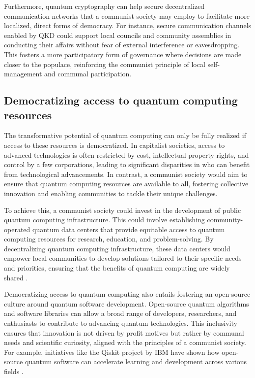 Furthermore, quantum cryptography can help secure decentralized communication networks that a communist society may employ to facilitate more localized, direct forms of democracy. For instance, secure communication channels enabled by QKD could support local councils and community assemblies in conducting their affairs without fear of external interference or eavesdropping. This fosters a more participatory form of governance where decisions are made closer to the populace, reinforcing the communist principle of local self-management and communal participation.

\subsection{Democratizing access to quantum computing resources}

The transformative potential of quantum computing can only be fully realized if access to these resources is democratized. In capitalist societies, access to advanced technologies is often restricted by cost, intellectual property rights, and control by a few corporations, leading to significant disparities in who can benefit from technological advancements. In contrast, a communist society would aim to ensure that quantum computing resources are available to all, fostering collective innovation and enabling communities to tackle their unique challenges.

To achieve this, a communist society could invest in the development of public quantum computing infrastructure. This could involve establishing community-operated quantum data centers that provide equitable access to quantum computing resources for research, education, and problem-solving. By decentralizing quantum computing infrastructure, these data centers would empower local communities to develop solutions tailored to their specific needs and priorities, ensuring that the benefits of quantum computing are widely shared \cite[pp.~88-91]{CommunityQuantum2023}.

Democratizing access to quantum computing also entails fostering an open-source culture around quantum software development. Open-source quantum algorithms and software libraries can allow a broad range of developers, researchers, and enthusiasts to contribute to advancing quantum technologies. This inclusivity ensures that innovation is not driven by profit motives but rather by communal needs and scientific curiosity, aligned with the principles of a communist society. For example, initiatives like the Qiskit project by IBM have shown how open-source quantum software can accelerate learning and development across various fields \cite[pp.~200-205]{Qiskit2022}.

